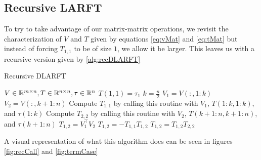 \documentclass[12pt]{article}
\begin{document}
    \subsection{Recursive LARFT}
    To try to take advantage of our matrix-matrix operations, we revisit the characterization of $V$ and $T$
    given by equations \ref{eq:vMat} and \ref{eq:tMat} but instead of forcing $T_{1,1}$ to be of size $1$, we 
    allow it be larger. This leaves us with a recursive version given by \ref{alg:recDLARFT}
    
    \begin{algorithm}
        \caption{Recursive DLARFT}\label{alg:recDLARFT}
        \begin{algorithmic}[1]
            \REQUIRE $V\in\mathbb{R}^{m\times n}, T\in\mathbb{R}^{n\times n}, \tau\in\mathbb{R}^n$\hfill{}
                \STATE $T(1,1) = \tau_1$
                \RETURN
            \ENDIF
            \STATE $k = \frac{n}{2}$\hfill{}
            \STATE $V_1 = V(:,1:k)$
            \STATE $V_2 = V(:,k+1:n)$
            \STATE Compute $T_{1,1}$ by calling this routine with $V_1$, $T(1:k,1:k)$, and $\tau(1:k)$
            \STATE Compute $T_{2,2}$ by calling this routine with $V_2$, $T(k+1:n,k+1:n)$, and $\tau(k+1:n)$
            \STATE $T_{1,2} = V_1^\top V_2$
            \STATE $T_{1,2} = -T_{1,1}T_{1,2}$
            \STATE $T_{1,2} = T_{1,2}T_{2,2}$
            \RETURN
        \end{algorithmic}
    \end{algorithm}

    A visual representation of what this algorithm does can be seen in figures \ref{fig:recCall} and \ref{fig:termCase}
\end{document}

